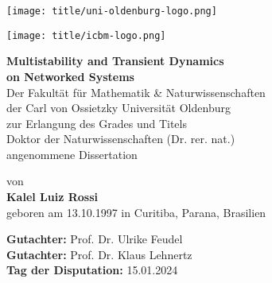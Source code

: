 \begin{titlepage}
    \centering
    \begin{minipage}{0.4\textwidth}
        \centering
        \texttt{[image: title/uni-oldenburg-logo.png]}  %
    \end{minipage}
    \hfill
    \begin{minipage}{0.4\textwidth}
        \centering
        \texttt{[image: title/icbm-logo.png]}  %
    \end{minipage}
    
    \vspace*{2.0cm}
    {\hline \vspace{0.4cm} \huge \textbf{Multistability and Transient Dynamics \\[0.25cm] on Networked Systems} \vspace{0.4cm} \hline} \\[2.2cm]  %
    
    
    \vspace*{2.8cm}  %
    {\large Der Fakultät für Mathematik \& Naturwissenschaften \\[0.25cm]
    der Carl von Ossietzky Universität Oldenburg \\[0.25cm]
    zur Erlangung des Grades und Titels \\[0.25cm]
    Doktor der Naturwissenschaften (Dr. rer. nat.) \\[0.25cm]
    angenommene Dissertation}
    
	\vfill
    {\large von \\[0.28cm]
    \textbf{Kalel Luiz Rossi} \\[0.28cm]
    geboren am 13.10.1997 in Curitiba, Parana, Brasilien}
    
    
\end{titlepage}

\newpage  %


\vspace*{\fill}  %
\begin{flushleft}
	\large
    \textbf{Gutachter:} Prof. Dr. Ulrike Feudel  \\[0.2cm]
    \textbf{Gutachter:} Prof. Dr. Klaus Lehnertz \\[0.2cm]
    \textbf{Tag der Disputation:} 15.01.2024
\end{flushleft}

\newpage  %